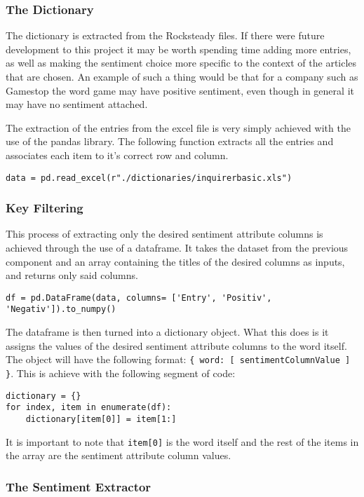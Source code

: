 \subsubsection{The Dictionary}

The dictionary is extracted from the Rocksteady files. If there were future development to this project it may be worth spending time adding more entries, as well as making the sentiment choice more specific to the context of the articles that are chosen. An example of such a thing would be that for a company such as Gamestop the word game may have positive sentiment, even though in general it may have no sentiment attached.

The extraction of the entries from the excel file is very simply achieved with the use of the pandas library. The following function extracts all the entries and associates each item to it's correct row and column.
\begin{lstlisting}[caption=Dictionary Extraction]
data = pd.read_excel(r"./dictionaries/inquirerbasic.xls") 
\end{lstlisting}

\subsubsection{Key Filtering}

This process of extracting only the desired sentiment attribute columns is achieved through the use of a dataframe. It takes the dataset from the previous component and an array containing the titles of the desired columns as inputs, and returns only said columns.
\begin{lstlisting}[caption=Key Filtering Dataframe]
df = pd.DataFrame(data, columns= ['Entry', 'Positiv', 'Negativ']).to_numpy()
\end{lstlisting}
The dataframe is then turned into a dictionary object. What this does is it assigns the values of the desired sentiment attribute columns to the word itself. The object will have the following format: \verb|{ word: [ sentimentColumnValue ] }|. This is achieve with the following segment of code:
\begin{lstlisting}[caption=Dictionary Creation]
dictionary = {}
for index, item in enumerate(df):
    dictionary[item[0]] = item[1:]
\end{lstlisting}
It is important to note that \verb|item[0]| is the word itself and the rest of the items in the array are the sentiment attribute column values.

\subsubsection{The Sentiment Extractor}

